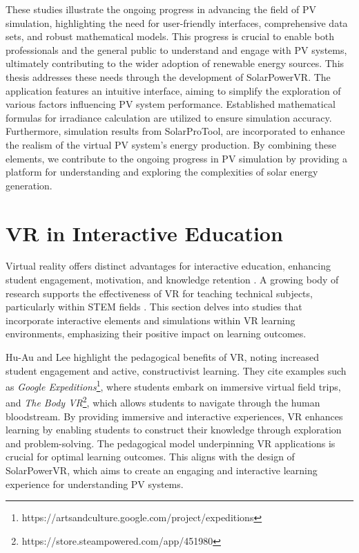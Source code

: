 \documentclass[draft, final]{vutinfth} %
\begin{document}
These studies illustrate the ongoing progress in advancing the field of PV simulation, highlighting the need for user-friendly interfaces, comprehensive data sets, and robust mathematical models. This progress is crucial to enable both professionals and the general public to understand and engage with PV systems, ultimately contributing to the wider adoption of renewable energy sources. This thesis addresses these needs through the development of SolarPowerVR. The application features an intuitive interface, aiming to simplify the exploration of various factors influencing PV system performance. Established mathematical formulas for irradiance calculation are utilized to ensure simulation accuracy. Furthermore, simulation results from SolarProTool, are incorporated to enhance the realism of the virtual PV system's energy production. By combining these elements, we contribute to the ongoing progress in PV simulation by providing a platform for understanding and exploring the complexities of solar energy generation.

\section{VR in Interactive Education}

Virtual reality offers distinct advantages for interactive education, enhancing student engagement, motivation, and knowledge retention \cite{Dalgarno2010Learning, HuAu2018VrExperience, Lege2020VrProgress}. A growing body of research supports the effectiveness of VR for teaching technical subjects, particularly within STEM fields \cite{Merchant2014VrEffectiveness, Mikropoulos2011VrEducational}. This section delves into studies that incorporate interactive elements and simulations within VR learning environments, emphasizing their positive impact on learning outcomes.

Hu-Au and Lee \cite{HuAu2018VrExperience} highlight the pedagogical benefits of VR, noting increased student engagement and active, constructivist learning. They cite examples such as \textit{Google Expeditions}\footnote{https://artsandculture.google.com/project/expeditions}, where students embark on immersive virtual field trips, and \textit{The Body VR}\footnote{https://store.steampowered.com/app/451980}, which allows students to navigate through the human bloodstream. By providing immersive and interactive experiences, VR enhances learning by enabling students to construct their knowledge through exploration and problem-solving. The pedagogical model underpinning VR applications is crucial for optimal learning outcomes. This aligns with the design of SolarPowerVR, which aims to create an engaging and interactive learning experience for understanding PV systems.
\end{document}
